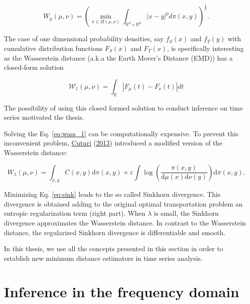 \documentclass[
  11pt,
]{article}
\begin{document}
\begin{equation}
W_{p}(\mu, \nu)=\left(\min _{\pi \in \Pi(\mu, \nu)} \int_{\mathbb{R}^{d} \times \mathbb{R}^{d}}|x-y|^{p} d \pi(x, y)\right)^{\frac{1}{p}}.
\end{equation}

The case of one dimensional probability densities, say \(f_S(x)\) and
\(f_T(y)\) with cumulative distribution functions \(F_S(x)\) and
\(F_T(x)\), is specifically interesting as the Wasserstein distance
(a.k.a the Earth Mover's Distance (EMD)) has a closed-form solution

\begin{equation}
\mathcal{W}_{1}(\mu, \nu)=\int_{\mathbb{R}}\left|F_{\mu}(t)-F_{\nu}(t)\right| d t
\label{eq:wass_1}
\end{equation}

The possibility of using this closed formed solution to conduct
inference on time series motivated the thesis.

Solving the Eq. \ref{eq:wass_1} can be computationally expensive. To
prevent this inconvenient problem,
\protect\hyperlink{ref-cuturi2013sinkhorn}{Cuturi}
(\protect\hyperlink{ref-cuturi2013sinkhorn}{2013}) introduced a modified
version of the Wasserstein distance:

\begin{equation}
W_{\lambda}(\mu, \nu) =\int_{x, y} C(x, y) \mathrm{d} \pi(x, y)+ \varepsilon \int \log \left(\frac{\pi(x, y)}{\mathrm{d} \mu(x) \mathrm{d} \nu(y)}\right) \mathrm{d} \pi(x, y). 
\label{eq:sink}
\end{equation}

Minimizing Eq. \ref{eq:sink} leads to the so called Sinkhorn divergence.
This divergence is obtained adding to the original optimal
transportation problem an entropic regularization term (right part).
When \(\lambda\) is small, the Sinkhorn divergence approximates the
Wasserstein distance. In contrast to the Wasserstein distance, the
regularized Sinkhorn divergence is differentiable and smooth.

In this thesis, we use all the concepts presented in this section in
order to establish new minimum distance estimators in time series
analysis.

\hypertarget{inference-in-the-frequency-domain}{%
\section{Inference in the frequency
domain}\label{inference-in-the-frequency-domain}}
\end{document}
